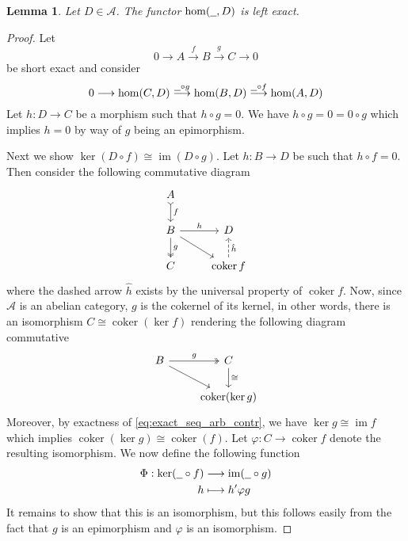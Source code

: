 \documentclass[12pt]{article}
\theoremstyle{plain}
\newtheorem{lemma}[thm]{Lemma}
\theoremstyle{definition}
\newcommand{\scr}[1]{\mathscr{#1}}
\newcommand{\und}[1]{\underline{\hspace{#1 cm}}}
\newcommand{\lto}{\longrightarrow}
\begin{document}
\begin{lemma}
Let $D \in \scr{A}$. The functor $\operatorname{hom}(\und{0.2},D)$ is left exact.
\end{lemma}
\begin{proof}
Let
\begin{equation}\label{eq:exact_seq_arb_contr}
0 \lto A\stackrel{f}{\lto} B \stackrel{g}{\lto}C \lto 0
\end{equation}
be short exact and consider
\begin{equation}
0 \lto \operatorname{hom}(C,D) \stackrel{\und{0.2} \circ g}{\lto} \operatorname{hom}(B,D)\stackrel{\und{0.2} \circ f}{\lto}\operatorname{hom}(A,D)
\end{equation}
Let $h: D \lto C$ be a morphism such that $h \circ g = 0$. We have $h \circ g = 0 = 0 \circ g$ which implies $h = 0$ by way of $g$ being an epimorphism.

Next we show $\operatorname{ker}(D \circ f) \cong \operatorname{im}(D \circ g)$. Let $h: B \lto D$ be such that $h\circ f =0$. Then consider the following commutative diagram
\begin{equation}
\begin{tikzcd}
A\arrow[d,rightarrowtail,"f"]\\
B\arrow[r,"h"]\arrow[d,twoheadrightarrow,"g"]\arrow[dr] & D\\
C & \operatorname{coker}f\arrow[u,dashed,swap,"\hat{h}"]
\end{tikzcd}
\end{equation}
where the dashed arrow $\hat{h}$ exists by the universal property of $\operatorname{coker}f$. Now, since $\scr{A}$ is an abelian category, $g$ is the cokernel of its kernel, in other words, there is an isomorphism $C \cong \operatorname{coker}(\operatorname{ker}f)$ rendering the following diagram commutative
\begin{equation}
\begin{tikzcd}
B\arrow[r,twoheadrightarrow,"g"]\arrow[dr] & C\arrow[d,"{\cong}"]\\
& \operatorname{coker}(\operatorname{ker}g)
\end{tikzcd}
\end{equation}
Moreover, by exactness of \eqref{eq:exact_seq_arb_contr}, we have $\operatorname{ker}g \cong \operatorname{im}f$ which implies $\operatorname{coker}(\operatorname{ker}g) \cong \operatorname{coker}(f)$. Let $\varphi: C \lto \operatorname{coker}f$ denote the resulting isomorphism. We now define the following function
\begin{align*}
\Phi: \operatorname{ker}(\und{0.2} \circ f) &\lto \operatorname{im}(\und{0.2} \circ g)\\
h & \longmapsto h' \varphi g
\end{align*}
It remains to show that this is an isomorphism, but this follows easily from the fact that $g$ is an epimorphism and $\varphi$ is an isomorphism.
\end{proof}
\end{document}
